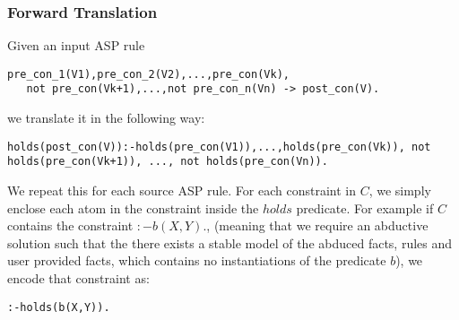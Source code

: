 \subsubsection{Forward Translation}
Given an input ASP rule 
\begin{lstlisting}[frame=none]
pre_con_1(V1),pre_con_2(V2),...,pre_con(Vk),
   not pre_con(Vk+1),...,not pre_con_n(Vn) -> post_con(V).
\end{lstlisting}
we translate it in the following way:
\begin{lstlisting}[frame=none]
holds(post_con(V)):-holds(pre_con(V1)),...,holds(pre_con(Vk)), not holds(pre_con(Vk+1)), ..., not holds(pre_con(Vn)). 
\end{lstlisting}

We repeat this for each source ASP rule. For each constraint in $C$, we simply
enclose each atom in the constraint inside the $holds$ predicate. For example
if $C$ contains the constraint $:-b(X,Y).$, (meaning that we require an
abductive solution such that the there exists a stable model of the abduced
facts, rules and user provided facts, which contains no instantiations of the
predicate $b$), we encode that constraint as: 
\begin{lstlisting}[frame=none]
:-holds(b(X,Y)).
\end{lstlisting}

